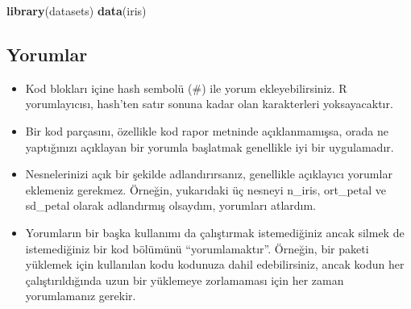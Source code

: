 \documentclass[
  oneside]{book}
\newenvironment{Shaded}{\begin{snugshade}}{\end{snugshade}}
\newcommand{\CommentTok}[1]{\textcolor[rgb]{0.56,0.35,0.01}{\textit{#1}}}
\newcommand{\FunctionTok}[1]{\textcolor[rgb]{0.13,0.29,0.53}{\textbf{#1}}}
\newcommand{\NormalTok}[1]{#1}
\newcommand{\OtherTok}[1]{\textcolor[rgb]{0.56,0.35,0.01}{#1}}
\newcommand{\SpecialCharTok}[1]{\textcolor[rgb]{0.81,0.36,0.00}{\textbf{#1}}}
\providecommand{\tightlist}{%
  \setlength{\itemsep}{0pt}\setlength{\parskip}{0pt}}
\begin{document}
\begin{Shaded}
\begin{Highlighting}[]
\FunctionTok{library}\NormalTok{(datasets)}
\FunctionTok{data}\NormalTok{(iris)}
\end{Highlighting}
\end{Shaded}

\hypertarget{yorumlar}{%
\subsection{Yorumlar}\label{yorumlar}}

\begin{itemize}
\tightlist
\item
  Kod blokları içine hash sembolü (\#) ile yorum ekleyebilirsiniz. R yorumlayıcısı, hash'ten satır sonuna kadar olan karakterleri yoksayacaktır.
\end{itemize}

\begin{Shaded}
\end{Shaded}

\begin{itemize}
\item
  Bir kod parçasını, özellikle kod rapor metninde açıklanmamışsa, orada ne yaptığınızı açıklayan bir yorumla başlatmak genellikle iyi bir uygulamadır.
\item
  Nesnelerinizi açık bir şekilde adlandırırsanız, genellikle açıklayıcı yorumlar eklemeniz gerekmez. Örneğin, yukarıdaki üç nesneyi n\_iris, ort\_petal ve sd\_petal olarak adlandırmış olsaydım, yorumları atlardım.
\item
  Yorumların bir başka kullanımı da çalıştırmak istemediğiniz ancak silmek de istemediğiniz bir kod bölümünü ``yorumlamaktır''. Örneğin, bir paketi yüklemek için kullanılan kodu kodunuza dahil edebilirsiniz, ancak kodun her çalıştırıldığında uzun bir yüklemeye zorlamaması için her zaman yorumlamanız gerekir.
\end{itemize}
\end{document}
